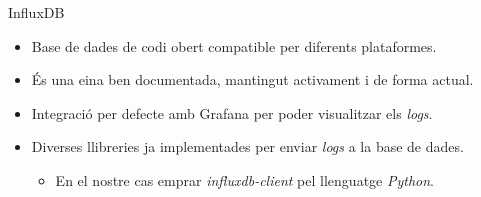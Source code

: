 \begin{frame}{InfluxDB}

    \begin{itemize}%
        \item Base de dades de codi obert compatible per diferents plataformes.
        \item És una eina ben documentada, mantingut activament i de forma actual.
        \item Integració per defecte amb Grafana per poder visualitzar els \textit{logs}.
        \item Diverses llibreries ja implementades per enviar \textit{logs} a la base de dades.
        \begin{itemize}
            \item En el nostre cas emprar \textit{influxdb-client} pel llenguatge \textit{Python}.
        \end{itemize}
    \end{itemize}
\end{frame}


